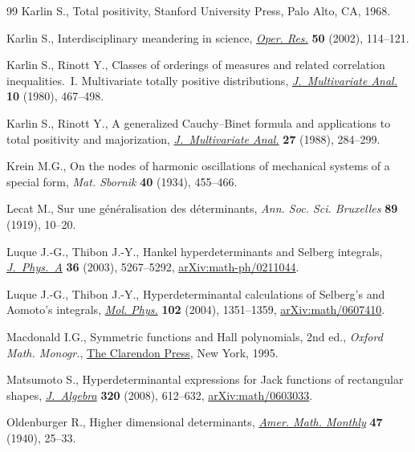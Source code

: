 \begin{thebibliography}{99}
Karlin S., Total positivity, Stanford University Press, Palo Alto, CA, 1968.

Karlin S., Interdisciplinary meandering in science, \href{https://doi.org/10.1287/opre.50.1.114.17800}{\textit{Oper. Res.}} \textbf{50} (2002), 114--121.

Karlin S., Rinott Y., Classes of orderings of measures and related correlation
 inequalities.~{I}. {M}ultivariate totally positive distributions,
 \href{https://doi.org/10.1016/0047-259X(80)90065-2}{\textit{J.~Multivariate
 Anal.}} \textbf{10} (1980), 467--498.

Karlin S., Rinott Y., A generalized {C}auchy--{B}inet formula and applications
 to total positivity and majorization,
 \href{https://doi.org/10.1016/0047-259X(88)90131-5}{\textit{J.~Multivariate
 Anal.}} \textbf{27} (1988), 284--299.

Krein M.G., On the nodes of harmonic oscillations of mechanical systems of a
 special form, \textit{Mat. Sbornik} \textbf{40} (1934), 455--466.

Lecat M., Sur une g\'en\'eralisation des d\'eterminants, \textit{Ann. Soc. Sci.
 Bruxelles} \textbf{89} (1919), 10--20.

Luque J.-G., Thibon J.-Y., Hankel hyperdeterminants and {S}elberg integrals,
 \href{https://doi.org/10.1088/0305-4470/36/19/306}{\textit{J.~Phys.~A}}
 \textbf{36} (2003), 5267--5292,
 \href{http://arxiv.org/abs/math-ph/0211044}{arXiv:math-ph/0211044}.

Luque J.-G., Thibon J.-Y., Hyperdeterminantal calculations of {S}elberg's and
 {A}omoto's integrals,
 \href{https://doi.org/10.1081/00268970410001728573}{\textit{Mol. Phys.}}
 \textbf{102} (2004), 1351--1359,
 \href{http://arxiv.org/abs/math/0607410}{arXiv:math/0607410}.

Macdonald I.G., Symmetric functions and {H}all polynomials, 2nd ed., \textit{Oxford
 Math. Monogr.}, \href{https://doi.org/10.1093/oso/9780198534891.001.0001}{The
 Clarendon Press}, New York, 1995.

Matsumoto S., Hyperdeterminantal expressions for {J}ack functions of
 rectangular shapes,
 \href{https://doi.org/10.1016/j.jalgebra.2007.09.013}{\textit{J.~Algebra}}
 \textbf{320} (2008), 612--632,
 \href{http://arxiv.org/abs/math/0603033}{arXiv:math/0603033}.

Oldenburger R., Higher dimensional determinants,
 \href{https://doi.org/10.2307/2304053}{\textit{Amer. Math. Monthly}}
 \textbf{47} (1940), 25--33.


\end{thebibliography}
